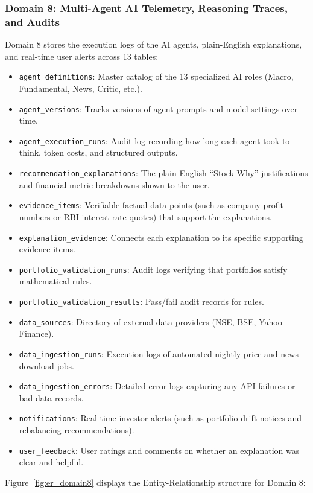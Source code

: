 \subsubsection{Domain 8: Multi-Agent AI Telemetry, Reasoning Traces, and Audits}
Domain 8 stores the execution logs of the AI agents, plain-English explanations, and real-time user alerts across 13 tables:
\begin{itemize}
    \item \texttt{agent\_definitions}: Master catalog of the 13 specialized AI roles (Macro, Fundamental, News, Critic, etc.).
    \item \texttt{agent\_versions}: Tracks versions of agent prompts and model settings over time.
    \item \texttt{agent\_execution\_runs}: Audit log recording how long each agent took to think, token costs, and structured outputs.
    \item \texttt{recommendation\_explanations}: The plain-English ``Stock-Why'' justifications and financial metric breakdowns shown to the user.
    \item \texttt{evidence\_items}: Verifiable factual data points (such as company profit numbers or RBI interest rate quotes) that support the explanations.
    \item \texttt{explanation\_evidence}: Connects each explanation to its specific supporting evidence items.
    \item \texttt{portfolio\_validation\_runs}: Audit logs verifying that portfolios satisfy mathematical rules.
    \item \texttt{portfolio\_validation\_results}: Pass/fail audit records for rules.
    \item \texttt{data\_sources}: Directory of external data providers (NSE, BSE, Yahoo Finance).
    \item \texttt{data\_ingestion\_runs}: Execution logs of automated nightly price and news download jobs.
    \item \texttt{data\_ingestion\_errors}: Detailed error logs capturing any API failures or bad data records.
    \item \texttt{notifications}: Real-time investor alerts (such as portfolio drift notices and rebalancing recommendations).
    \item \texttt{user\_feedback}: User ratings and comments on whether an explanation was clear and helpful.
\end{itemize}

Figure~\ref{fig:er_domain8} displays the Entity-Relationship structure for Domain 8:


